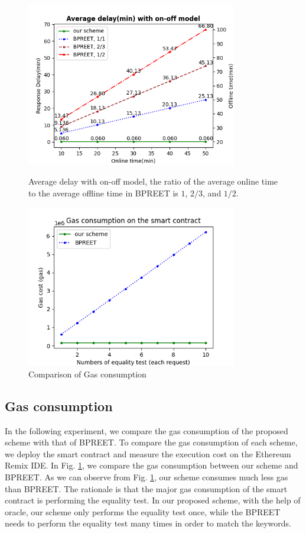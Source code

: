 \documentclass[journal,10pt]{IEEEtran}
\begin{document}
\begin{figure}[h]
    \centering
    \includegraphics[width=260pt]{picture/onoff_plot3.png}
    \caption{Average delay with on-off model, the ratio of the average online time to the average offline time in BPREET is $1$, $2/3$, and $1/2$.}
    \label{fig:delay_onoff}
    
    \centering
    \includegraphics[width=260pt]{picture/gas2.png}
    \caption{Comparison of Gas consumption}
    \label{fig:gas_cost}
\end{figure}

\subsection{Gas consumption}
In the following experiment, we compare the gas consumption of the proposed scheme with that of BPREET. To compare the gas consumption of each scheme, we deploy the smart contract and measure the execution cost on the Ethereum Remix IDE. In Fig. \ref{fig:gas_cost}, we compare the gas consumption between our scheme and BPREET. As we can observe from Fig. \ref{fig:gas_cost}, our scheme consumes much less gas than BPREET. The rationale is that the major gas consumption of the smart contract is performing the equality test. In our proposed scheme, with the help of oracle, our scheme only performs the equality test once, while the BPREET needs to perform the equality test many times in order to match the keywords. 
\end{document}
